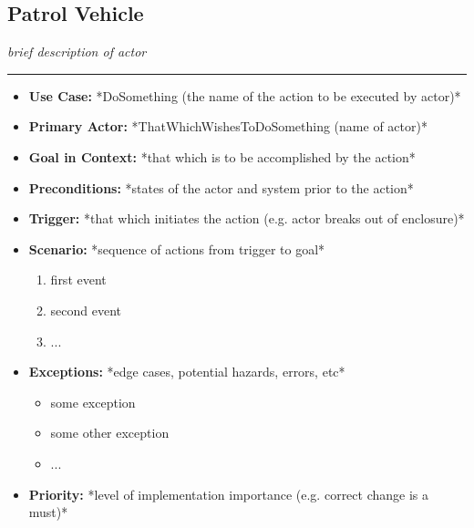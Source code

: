 \documentclass[12pt]{article}
\begin{document}
    \subsection{Patrol Vehicle}
    \textit{brief description of actor}
    \par\noindent\rule{\textwidth}{0.4pt}    
    \begin{itemize}
        \item[]\textbf{Use Case:}                                
            *DoSomething (the name of the action to be executed by actor)*

        \item[]\textbf{Primary Actor:}
            *ThatWhichWishesToDoSomething (name of actor)*

        \item[]\textbf{Goal in Context:}
            *that which is to be accomplished by the action*

        \item[]\textbf{Preconditions:}
            *states of the actor and system prior to the action*

        \item[]\textbf{Trigger:}
            *that which initiates the action (e.g. actor breaks out of enclosure)*

        \item[]\textbf{Scenario:}
            *sequence of actions from trigger to goal*
            \begin{enumerate}
                \item first event
                \item second event
                \item ...
            \end{enumerate}

        \item[]\textbf{Exceptions:}
            *edge cases, potential hazards, errors, etc*
            \begin{itemize}
                \item[] some exception
                \item[] some other exception                
                \item[] ...
            \end{itemize}

        \item[]\textbf{Priority:}
            *level of implementation importance (e.g. correct change is a must)*


\end{itemize}
\end{document}
